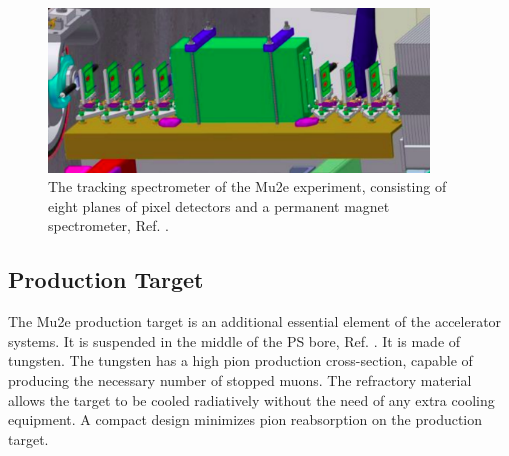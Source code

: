 \begin{figure}[!h]
\centering
\includegraphics[width =0.9\textwidth]{images/chapter2/Screenshot_20240306_184720.png}
\caption{The tracking spectrometer of the Mu2e experiment, consisting of eight planes of pixel detectors and a permanent magnet spectrometer, Ref. \cite{Prebys:IPAC2015-THPF121}.}
\label{fig:extintionmonitor}
\end{figure}
\subsection{Production Target}
The Mu2e production target is an additional essential element of the accelerator systems. It is suspended in the middle of the PS bore, Ref. \cite{bartoszek2015mu2e}. It is made of tungsten. The tungsten has a high pion production cross-section, capable of producing the necessary number of stopped muons. The refractory material allows the target to be cooled radiatively without the need of any extra cooling equipment. A compact design minimizes pion reabsorption on the production target.

